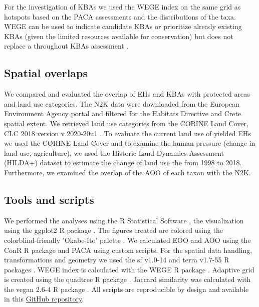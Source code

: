 For the investigation of KBAs \parencite{iucn2016} we used the WEGE index \parencite{farooq2020wege}
on the same grid as hotspots based on the PACA assessments and the distributions
of the taxa. WEGE can be used to indicate candidate KBAs or prioritize already
existing KBAs (given the limited resources available for conservation) but does
not replace a throughout KBAs assessment \parencite{farooq2020wege}.

    \subsection{Spatial overlaps}
    \label{subsec:arthropods-spatial}
We compared and evaluated the overlap of EHs and KBAs with protected areas and
land use categories. The N2K data were downloaded from the European Environment
Agency portal and filtered for the Habitats Directive and Crete spatial extent.
We retrieved land use categories from the CORINE Land Cover, CLC 2018 version
v.2020-20u1 \parencite{CLC2023}.
To evaluate the current land use of yielded EHs we used the CORINE Land Cover
and to examine the human pressure (change in land use, agriculture), we used the
Historic Land Dynamics Assessment (HILDA+) dataset \parencite{winkler2021global} to
estimate the change of land use the from 1998 to 2018. Furthermore, we examined
the overlap of the AOO of each taxon with the N2K.


    \subsection{Tools and scripts}
    \label{subsec:arthropods-tools}
We performed the analyses using the R Statistical Software \parencite{rcoreteam},
the visualization using the ggplot2 R package \parencite{wickham_ggplot2_2016}. The figures
created are colored using the colorblind-friendly 'Okabe-Ito' palette \parencite{ichihara2008color}.
We calculated EOO and AOO using the ConR R package \parencite{dauby2017conr:} and PACA
using custom scripts. For the spatial data handling, transformations and
geometry we used the sf v1.0-14 \parencite{pebesma2018simple} and terra v1.7-55 R packages \parencite{hijmans2024terra}.
WEGE index is calculated with the WEGE R package \parencite{farooq2020wege}.
Adaptive grid is created using the quadtree R package \parencite{friend2023quadtree}.
Jaccard similarity was calculated with the vegan 2.6-4 R package \parencite{oksanen2024vegan}.
All scripts are reproducible by design and available in this 
\href{https://github.com/savvas-paragkamian/arthropoda_assessment_crete}{GitHub repository}.

